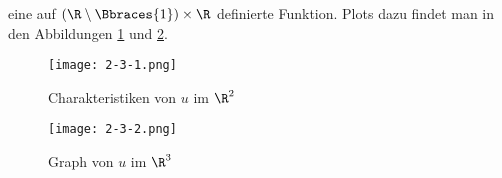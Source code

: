 \begin{solution}
\begin{enumerate}[label = (\roman*)]
	eine auf $(\R \setminus \Bbraces{1}) \times \R$ definierte Funktion.
	Plots dazu findet man in den Abbildungen \ref{fig:lsg_u_char} und \ref{fig:lsg_u_graph}.

	\begin{figure}[h!]
		\centering
		\texttt{[image: 2-3-1.png]}
		\caption{Charakteristiken von $u$ im $\R^2$}
		\label{fig:lsg_u_char}
	\end{figure}

	\begin{figure}[h!]
		\centering
		\texttt{[image: 2-3-2.png]}
		\caption{Graph von $u$ im $\R^3$}
		\label{fig:lsg_u_graph}
	\end{figure}
\end{enumerate}

\end{solution}

